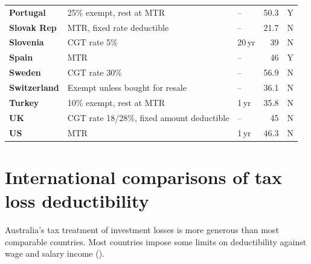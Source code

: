 \begin{subappendices}
\begin{table}
{\begin{tabular}[t]{>{\footnotesize}l>{\raggedleft\footnotesize}p{6.30cm}>{\raggedleft\footnotesize}p{1.20cm}>{\footnotesize}r>{\footnotesize\raggedleft\arraybackslash}p{1.40cm}}
 \textbf{Portugal}    & 25\% exempt, rest at MTR                                                 & --                   & 50.3             & Y \\
 \textbf{Slovak Rep}  & MTR, fixed rate deductible                                                                   & --                   & 21.7             & N \\
 \textbf{Slovenia}    & CGT rate 5\%                                                    & 20\,yr                  & 39               & N \\
 \textbf{Spain}       & MTR                                                                      & --                    & 46               & Y \\
 \textbf{Sweden}      & CGT rate 30\%                                                            & --                    & 56.9             & N \\
 \textbf{Switzerland} & Exempt unless bought for resale                                          & --                    & 36.1             & N \\
 \textbf{Turkey}      & 10\% exempt, rest at MTR                                                 & 1\,yr                   & 35.8             & N \\
 \textbf{UK}          & CGT rate 18/28\%, fixed amount deductible                                & --                    & 45               & N \\
 {\textbf{US}}        & MTR                                         & {1\,yr}                 & {46.3}           & {N} \\
\bottomrule
\end{tabular}}
\end{table}

\renewcommand{\arraystretch}{1.0}
\normalsize

\chapter{International comparisons of tax loss deductibility\label{appendix:CGT-C}\label{appendix:Intl-comparisons-tax-loss-deductibility}}
Australia’s tax treatment of investment losses is more generous than most comparable countries. Most countries impose some limits on deductibility against wage and salary income ().%

\afterpage{%
\thispagestyle{empty}}
\renewcommand{\arraystretch}{1.15}



\end{subappendices}
